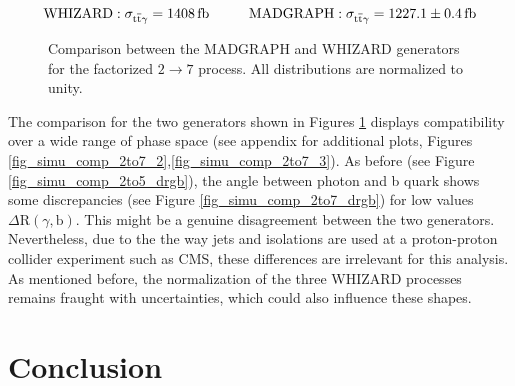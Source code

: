 \begin{equation}
\mathrm{WHIZARD: }\; \sigma_{\ttgamma} = \SI{1408}{\femto \barn} \hspace{1.cm} \mathrm{MADGRAPH: }\; \sigma_{\ttgamma} = \SI{1227.1 \pm 0.4}{\femto \barn}
\label{eq_simu_2to7_cross}
\end{equation}



\begin{figure}[ht]
\centering

  \caption{Comparison between the MADGRAPH and WHIZARD generators for the factorized $2 \to 7$ process. All distributions are normalized to unity.}
  \label{fig_simu_comp_2to7_1}
\end{figure}

The comparison for the two generators shown in Figures \ref{fig_simu_comp_2to7_1} displays compatibility over a wide range of phase space (see appendix for additional plots, Figures \ref{fig_simu_comp_2to7_2},\ref{fig_simu_comp_2to7_3}). As before (see Figure \ref{fig_simu_comp_2to5_drgb}), the angle between photon and b quark shows some discrepancies (see Figure \ref{fig_simu_comp_2to7_drgb}) for low values $\Delta \mathrm{R}(\gamma,\mathrm{b})$. This might be a genuine disagreement between the two generators. Nevertheless, due to the the way jets and isolations are used at a proton-proton collider experiment such as CMS, these differences are irrelevant for this analysis. As mentioned before, the normalization of the three WHIZARD processes remains fraught with uncertainties, which could also influence these shapes. \\

\section{Conclusion}
\label{sec_simu_conc}

